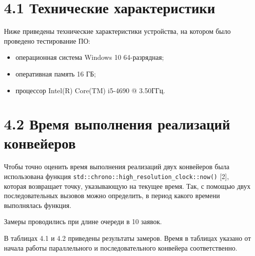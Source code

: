 \documentclass[12pt, a4paper]{report}
\begin{document}
	\section*{4.1 Технические характеристики}
	
	Ниже приведены технические характеристики устройства, на котором было проведено тестирование ПО:
	
	\begin{itemize}
		\item операционная система Windows 10 64-разрядная;
		\item оперативная память 16 ГБ;
		\item процессор Intel(R) Core(TM) i5-4690 @ 3.50ГГц.
	\end{itemize}
	
	\section*{4.2 Время выполнения реализаций конвейеров}
	
	Чтобы точно оценить время выполнения реализаций двух конвейеров была использована функция \verb|std::chrono::high_resolution_clock::now()| [2], которая возвращает точку, указывающую на текущее время. Так, с помощью двух последовательных вызовов можно определить, в период какого времени выполнялась функция.
	
	Замеры проводились при длине очереди в 10 заявок.
	
	В таблицах 4.1 и 4.2 приведены результаты замеров. Время в таблицах указано от начала работы параллельного и последовательного конвейера соответственно.
	
\end{document}
